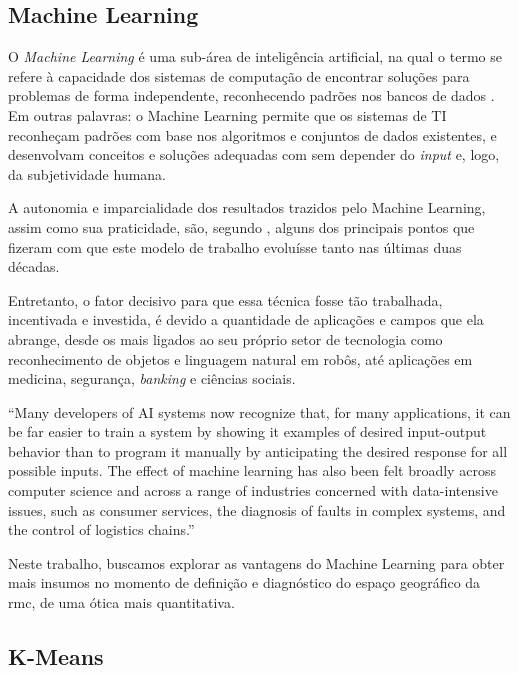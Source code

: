 	\subsection{Machine Learning}
	
	O \textit{Machine Learning} é uma sub-área de inteligência artificial, na qual o termo se refere à capacidade dos sistemas de computação de encontrar soluções para problemas de forma independente, reconhecendo padrões nos bancos de dados \cite{jordan2015a}. Em outras palavras: o Machine Learning permite que os sistemas de TI reconheçam padrões com base nos algoritmos e conjuntos de dados existentes, e desenvolvam conceitos e soluções adequadas com sem depender do \textit{input} e, logo, da subjetividade humana. 
	
	A autonomia e imparcialidade dos resultados trazidos pelo Machine Learning, assim como sua praticidade, são, segundo , alguns dos principais pontos que fizeram com que este modelo de trabalho evoluísse tanto nas últimas duas décadas. 
	
	Entretanto, o fator decisivo para que essa técnica fosse tão trabalhada, incentivada e investida, é devido a quantidade de aplicações e campos que ela abrange, desde os mais ligados ao seu próprio setor de tecnologia como reconhecimento de objetos e linguagem natural em robôs, até aplicações em medicina, segurança, \textit{banking} e ciências sociais.
	
	\begin{citacao}
		``Many developers of AI systems now recognize that, for many applications, it can be far easier to train a system by showing it examples of desired input-output behavior than to program it manually by anticipating the desired response for all possible inputs. The effect of machine learning has also been felt broadly across computer science and across a range of industries concerned with data-intensive issues, such as consumer services, the diagnosis of faults in complex systems, and the control of logistics chains.'' \cite[p. 255]{jordan2015a}
	\end{citacao}

	Neste trabalho, buscamos explorar as vantagens do Machine Learning para obter mais insumos no momento de definição e diagnóstico do espaço geográfico da \glsdesc{rmc}, de uma ótica mais quantitativa.
	
	\subsection{K-Means}
	
